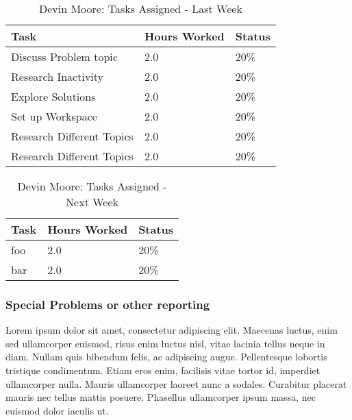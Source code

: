\documentclass[12pt,article,compsoc]{IEEEtran}
\begin{document}
	\begin{table}[ht]
	\renewcommand{\arraystretch}{1.3}
		\caption{Devin Moore: Tasks Assigned - Last Week}
		
		\label{Summary of Devin Moore's activities: last week}
		
		\centering
		\begin{tabular}{p{5.5cm}|p{1cm}|p{1cm}}

		\hline
		\bfseries 	Task		 		& \bfseries Hours Worked	& \bfseries Status	\\
		\hline\hline
					Discuss Problem topic	& 2.0						& 20\%				\\	%
					Research Inactivity	& 2.0						& 20\%				\\
					Explore Solutions	& 2.0						& 20\%				\\
					Set up Workspace	& 2.0						& 20\%				\\
					Research Different Topics	& 2.0						& 20\%				\\
					Research Different Topics	& 2.0						& 20\%				\\	
		\hline
		\end{tabular}
	\end{table}

	\begin{table}[ht]
	\renewcommand{\arraystretch}{1.3}
		\caption{Devin Moore: Tasks Assigned - Next Week}
		
		\label{Summary of Devin Moore's activites: this week}
		
		\centering
		\begin{tabular}{p{5.5cm}|p{1cm}|p{1cm}}

		\hline
		\bfseries 	Task		 		& \bfseries Hours Worked	& \bfseries Status	\\
		\hline\hline
					foo					& 2.0						& 20\%				\\	%
					bar					& 2.0						& 20\%				\\	
		\hline
		\end{tabular}
	\end{table}

	\subsubsection*{Special Problems or other reporting}
	Lorem ipsum dolor sit amet, consectetur adipiscing elit. Maecenas luctus, enim sed ullamcorper euismod, risus enim luctus nisl, vitae lacinia tellus neque in diam. Nullam quis bibendum felis, ac adipiscing augue. Pellentesque lobortis tristique condimentum. Etiam eros enim, facilisis vitae tortor id, imperdiet ullamcorper nulla. Mauris ullamcorper laoreet nunc a sodales. Curabitur placerat mauris nec tellus mattis posuere. Phasellus ullamcorper ipsum massa, nec euismod dolor iaculis ut.
\end{document}
